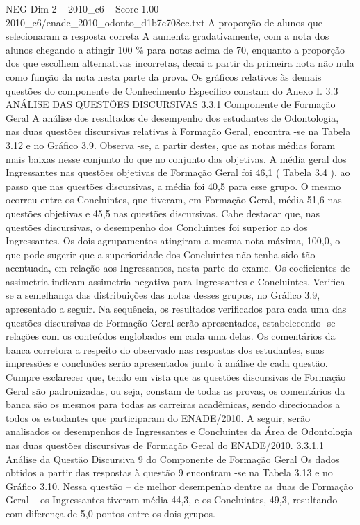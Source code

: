 \begin{textsample}{NEG Dim 2 – 2010\_c6 – Score 1.00 – 2010\_c6/enade\_2010\_odonto\_d1b7c708cc.txt}
A proporção de alunos que selecionaram a resposta correta A aumenta gradativamente, com a nota dos alunos chegando a atingir 100 \% para notas acima de 70, enquanto a proporção dos que escolhem alternativas incorretas, decai a partir da primeira nota não nula como função da nota nesta parte da prova.
Os gráficos relativos às demais questões do componente de Conhecimento Específico constam do Anexo I. 3.3 ANÁLISE DAS QUESTÕES DISCURSIVAS 3.3.1 Componente de Formação Geral A análise dos resultados de desempenho dos estudantes de Odontologia, nas duas questões discursivas relativas à Formação Geral, encontra -se na Tabela 3.12 e no Gráfico 3.9.
Observa -se, a partir destes, que as notas médias foram mais baixas nesse conjunto do que no conjunto das objetivas.
A média geral dos Ingressantes nas questões objetivas de Formação Geral foi 46,1 ( Tabela 3.4 ), ao passo que nas questões discursivas, a média foi 40,5 para esse grupo.
O mesmo ocorreu entre os Concluintes, que tiveram, em Formação Geral, média 51,6 nas questões objetivas e 45,5 nas questões discursivas.
Cabe destacar que, nas questões discursivas, o desempenho dos Concluintes foi superior ao dos Ingressantes.
Os dois agrupamentos atingiram a mesma nota máxima, 100,0, o que pode sugerir que a superioridade dos Concluintes não tenha sido tão acentuada, em relação aos Ingressantes, nesta parte do exame.
Os coeficientes de assimetria indicam assimetria negativa para Ingressantes e Concluintes.
Verifica -se a semelhança das distribuições das notas desses grupos, no Gráfico 3.9, apresentado a seguir.
Na sequência, os resultados verificados para cada uma das questões discursivas de Formação Geral serão apresentados, estabelecendo -se relações com os conteúdos englobados em cada uma delas.
Os comentários da banca corretora a respeito do observado nas respostas dos estudantes, suas impressões e conclusões serão apresentados junto à análise de cada questão.
Cumpre esclarecer que, tendo em vista que as questões discursivas de Formação Geral são padronizadas, ou seja, constam de todas as provas, os comentários da banca são os mesmos para todas as carreiras acadêmicas, sendo direcionados a todos os estudantes que participaram do ENADE/2010.
A seguir, serão analisados os desempenhos de Ingressantes e Concluintes da Área de Odontologia nas duas questões discursivas de Formação Geral do ENADE/2010. 3.3.1.1 Análise da Questão Discursiva 9 do Componente de Formação Geral Os dados obtidos a partir das respostas à questão 9 encontram -se na Tabela 3.13 e no Gráfico 3.10.
Nessa questão – de melhor desempenho dentre as duas de Formação Geral – os Ingressantes tiveram média 44,3, e os Concluintes, 49,3, resultando com diferença de 5,0 pontos entre os dois grupos.

\end{textsample}
